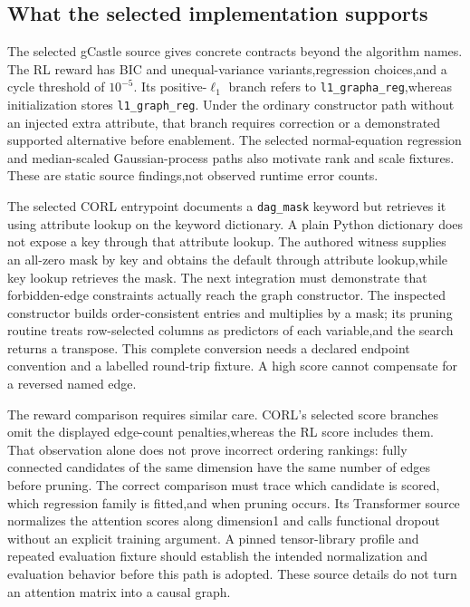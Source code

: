 \subsection{What the selected implementation supports}
The selected gCastle source gives concrete contracts beyond the algorithm names. The RL reward
has BIC and unequal-variance variants,regression choices,and a cycle threshold of $10^{-5}$.
Its positive-$\ell_1$ branch refers to \texttt{l1\_grapha\_reg},whereas initialization stores
\texttt{l1\_graph\_reg}. Under the ordinary constructor path without an injected extra attribute,
that branch requires correction or a demonstrated supported alternative before enablement.
The selected normal-equation regression and median-scaled Gaussian-process paths also motivate
rank and scale fixtures. These are static source findings,not observed runtime error counts.
\citep{exec28_rl_gcastle}

The selected CORL entrypoint documents a \texttt{dag\_mask} keyword but retrieves it using
attribute lookup on the keyword dictionary. A plain Python dictionary does not expose a key
through that attribute lookup. The authored witness supplies an all-zero mask by key and obtains
the default through attribute lookup,while key lookup retrieves the mask. The next integration
must demonstrate that forbidden-edge constraints actually reach the graph constructor.
The inspected constructor builds order-consistent entries and multiplies by a mask; its pruning
routine treats row-selected columns as predictors of each variable,and the search returns a
transpose. This complete conversion needs a declared endpoint convention and a labelled
round-trip fixture. A high score cannot compensate for a reversed named edge.
\citep{exec28_rl_gcastle,exec28_rl_reference}

The reward comparison requires similar care. CORL's selected score branches omit the displayed
edge-count penalties,whereas the RL score includes them. That observation alone does not prove
incorrect ordering rankings: fully connected candidates of the same dimension have the same
number of edges before pruning. The correct comparison must trace which candidate is scored,
which regression family is fitted,and when pruning occurs. Its Transformer source normalizes
the attention scores along dimension1 and calls functional dropout without an explicit training
argument. A pinned tensor-library profile and repeated evaluation fixture should establish the
intended normalization and evaluation behavior before this path is adopted. These source details
do not turn an attention matrix into a causal graph.~\citep{exec28_rl_gcastle}

